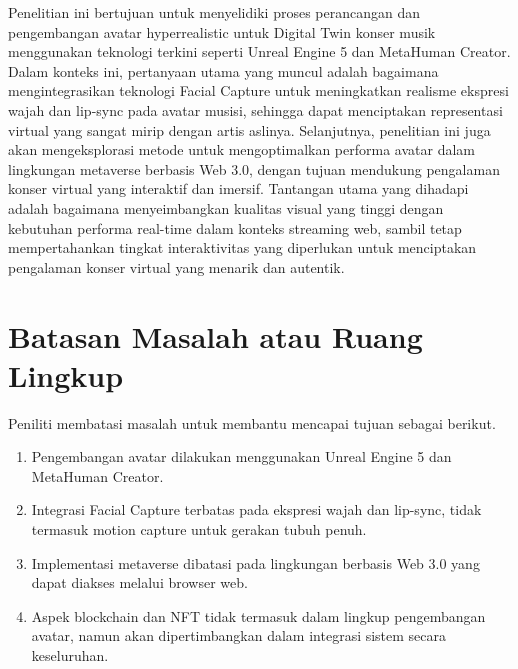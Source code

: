 
Penelitian ini bertujuan untuk menyelidiki proses perancangan dan pengembangan avatar hyperrealistic untuk Digital
Twin konser musik menggunakan teknologi terkini seperti Unreal Engine 5 dan MetaHuman Creator. Dalam konteks ini,
pertanyaan utama yang muncul adalah bagaimana mengintegrasikan teknologi Facial Capture untuk meningkatkan realisme
ekspresi wajah dan lip-sync pada avatar musisi, sehingga dapat menciptakan representasi virtual yang sangat mirip
dengan artis aslinya. Selanjutnya, penelitian ini juga akan mengeksplorasi metode untuk mengoptimalkan performa avatar
dalam lingkungan metaverse berbasis Web 3.0, dengan tujuan mendukung pengalaman konser virtual yang interaktif dan imersif. 
Tantangan utama yang dihadapi adalah bagaimana menyeimbangkan kualitas visual yang tinggi dengan kebutuhan performa real-time 
dalam konteks streaming web, sambil tetap mempertahankan tingkat interaktivitas yang diperlukan untuk menciptakan pengalaman 
konser virtual yang menarik dan autentik.

\section{Batasan Masalah atau Ruang Lingkup}

Peniliti membatasi masalah untuk membantu mencapai tujuan sebagai berikut.

\begin{enumerate}
    \item Pengembangan avatar dilakukan menggunakan Unreal Engine 5 dan MetaHuman Creator.
    \item Integrasi Facial Capture terbatas pada ekspresi wajah dan lip-sync, tidak termasuk motion capture untuk gerakan tubuh penuh.
    \item Implementasi metaverse dibatasi pada lingkungan berbasis Web 3.0 yang dapat diakses melalui browser web.
    \item Aspek blockchain dan NFT tidak termasuk dalam lingkup pengembangan avatar, namun akan dipertimbangkan dalam integrasi sistem secara keseluruhan.
\end{enumerate}


